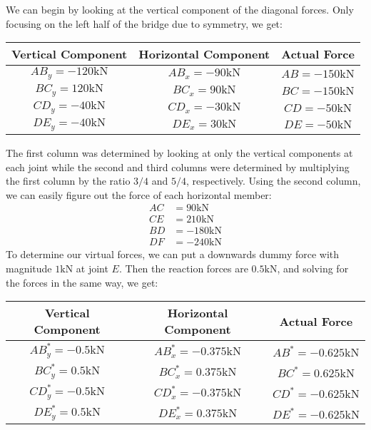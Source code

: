 \documentclass{article}
\begin{document}
We can begin by looking at the vertical component of the diagonal forces. Only focusing on the left half of the bridge due to symmetry, we get:
\begin{center}
    \begin{tabular}{|c|c|c|}
        \hline
        Vertical Component           & Horizontal Component         & Actual Force                 \\ \hline
        $AB_y=-120\si{\kilo\newton}$ & $AB_x=-90\si{\kilo\newton}$ & $AB=-150\si{\kilo\newton}$ \\ \hline
        $BC_y=120\si{\kilo\newton}$ & $BC_x=90\si{\kilo\newton}$ & $BC=-150\si{\kilo\newton}$ \\ \hline
        $CD_y=-40\si{\kilo\newton}$ & $CD_x=-30\si{\kilo\newton}$ & $CD=-50\si{\kilo\newton}$ \\ \hline
        $DE_y=-40\si{\kilo\newton}$ & $DE_x=30\si{\kilo\newton}$ & $DE=-50\si{\kilo\newton}$ \\ \hline
        \end{tabular}
\end{center}
The first column was determined by looking at only the vertical components at each joint while the second and third columns were determined by multiplying the first column by the ratio $3/4$ and $5/4$, respectively. Using the second column, we can easily figure out the force of each horizontal member:
\begin{align}
    AC&=90\si{\kilo\newton} \\ 
    CE&=210\si{\kilo\newton} \\ 
    BD&=-180\si{\kilo\newton} \\ 
    DF&=-240\si{\kilo\newton}
\end{align}
To determine our virtual forces, we can put a downwards dummy force with magnitude $1\si{\kilo\newton}$ at joint $E$. Then the reaction forces are $0.5\si{\kilo\newton}$, and solving for the forces in the same way, we get:
\begin{center}
    \begin{tabular}{|c|c|c|}
        \hline
        Vertical Component           & Horizontal Component         & Actual Force                 \\ \hline
        $AB_y^*=-0.5\si{\kilo\newton}$ & $AB_x^*=-0.375\si{\kilo\newton}$ & $AB ^*=-0.625\si{\kilo\newton}$ \\ \hline
        $BC_y^*=0.5\si{\kilo\newton}$ & $BC_x ^*=0.375\si{\kilo\newton}$ & $BC  ^*=0.625\si{\kilo\newton}$ \\ \hline
        $CD_y^*=-0.5\si{\kilo\newton}$ & $CD_x^* =-0.375\si{\kilo\newton}$ & $CD^*=-0.625\si{\kilo\newton}$ \\ \hline
        $DE_y^*=0.5\si{\kilo\newton}$ & $DE_x ^*=0.375\si{\kilo\newton}$ & $DE  ^*=-0.625\si{\kilo\newton}$ \\ \hline
        \end{tabular}
\end{center}
\end{document}

